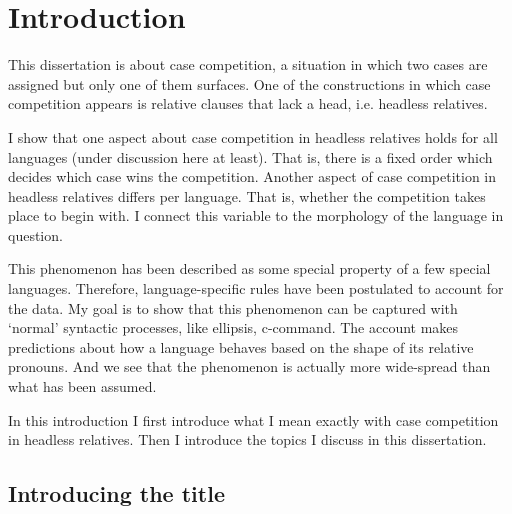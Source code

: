 
\chapter{Introduction}

This dissertation is about case competition, a situation in which two cases are assigned but only one of them surfaces. One of the constructions in which case competition appears is relative clauses that lack a head, i.e. headless relatives.

I show that one aspect about case competition in headless relatives holds for all languages (under discussion here at least). That is, there is a fixed order which decides which case wins the competition. Another aspect of case competition in headless relatives differs per language. That is, whether the competition takes place to begin with. I connect this variable to the morphology of the language in question.

This phenomenon has been described as some special property of a few special languages. Therefore, language-specific rules have been postulated to account for the data. My goal is to show that this phenomenon can be captured with `normal' syntactic processes, like ellipsis, c-command. The account makes predictions about how a language behaves based on the shape of its relative pronouns. And we see that the phenomenon is actually more wide-spread than what has been assumed.

In this introduction I first introduce what I mean exactly with case competition in headless relatives. Then I introduce the topics I discuss in this dissertation.


\section{Introducing the title}



